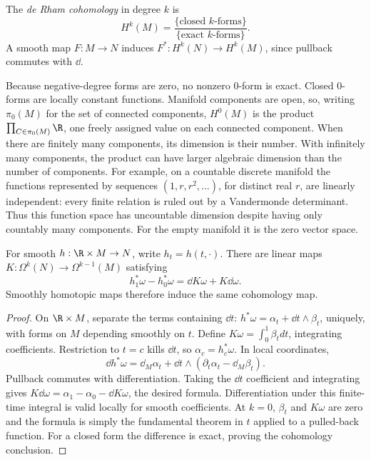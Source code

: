 \begin{definition}
The \emph{de Rham cohomology} in degree $k$ is
\[
H^k(M)=\frac{\{\text{closed }k\text{-forms}\}}{\{\text{exact }k\text{-forms}\}}.
\]
A smooth map $F:M\to N$ induces $F^*:H^k(N)\to H^k(M)$, since pullback commutes with $\dd$.
\end{definition}

Because negative-degree forms are zero, no nonzero $0$-form is exact. Closed $0$-forms are locally constant functions. Manifold components are open, so, writing $\pi_0(M)$ for the set of connected components, $H^0(M)$ is the product $\prod_{C\in\pi_0(M)}\R$, one freely assigned value on each connected component. When there are finitely many components, its dimension is their number. With infinitely many components, the product can have larger algebraic dimension than the number of components. For example, on a countable discrete manifold the functions represented by sequences $(1,r,r^2,\ldots)$, for distinct real $r$, are linearly independent: every finite relation is ruled out by a Vandermonde determinant. Thus this function space has uncountable dimension despite having only countably many components. For the empty manifold it is the zero vector space.

\begin{theorem}\label{thm:homotopy}
For smooth $h:\R\times M\to N$, write $h_t=h(t,\cdot)$. There are linear maps $K:\Omega^k(N)\to\Omega^{k-1}(M)$ satisfying
\[
h_1^*\omega-h_0^*\omega=\dd K\omega+K\dd\omega.
\]
Smoothly homotopic maps therefore induce the same cohomology map.
\end{theorem}

\begin{proof}
On $\R\times M$, separate the terms containing $\dd t$:
$h^*\omega=\alpha_t+\dd t\wedge\beta_t$, uniquely, with forms on $M$ depending smoothly on $t$. Define $K\omega=\int_0^1\beta_tdt$, integrating coefficients. Restriction to $t=c$ kills $\dd t$, so $\alpha_c=h_c^*\omega$. In local coordinates,
\[
\dd h^*\omega=\dd_M\alpha_t+\dd t\wedge(\partial_t\alpha_t-\dd_M\beta_t).
\]
Pullback commutes with differentiation. Taking the $\dd t$ coefficient and integrating gives
$K\dd\omega=\alpha_1-\alpha_0-\dd K\omega$, the desired formula. Differentiation under this finite-time integral is valid locally for smooth coefficients. At $k=0$, $\beta_t$ and $K\omega$ are zero and the formula is simply the fundamental theorem in $t$ applied to a pulled-back function. For a closed form the difference is exact, proving the cohomology conclusion.
\end{proof}

